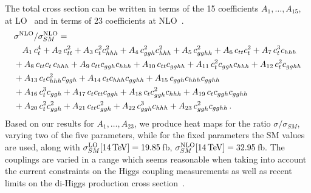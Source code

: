 
The total cross section can be written in terms of the 15 coefficients 
$A_1, \ldots, A_{15}$, at LO~\cite{Carvalho:2015ttv,Azatov:2015oxa} and in terms of 23 coefficients at NLO~\cite{Buchalla:2018yce}.
%
\begin{align}
\label{eq:Acoeffs_all}
&\sigma^{\rm{NLO}}/\sigma^{\rm{NLO}}_{SM}  =\nonumber\\
& \quad  A_1\, c_t^4 + A_2 \, c_{tt}^2  + A_3\,  c_t^2 c_{hhh}^2  + 
A_4 \, c_{ggh}^2 c_{hhh}^2  + A_5\,  c_{gghh}^2  + 
A_6\, c_{tt} c_t^2 + A_7\,  c_t^3 c_{hhh} \nonumber\\
& + A_8\,  c_{tt} c_t\, c_{hhh}  + A_9\, c_{tt} c_{ggh} c_{hhh} + A_{10}\, c_{tt} c_{gghh} + 
A_{11}\,  c_t^2 c_{ggh} c_{hhh} + A_{12}\, c_t^2 c_{gghh} \nonumber\\
& + A_{13}\, c_t c_{hhh}^2 c_{ggh}  + A_{14}\, c_t c_{hhh} c_{gghh} +
A_{15}\, c_{ggh} c_{hhh} c_{gghh} \nonumber\\ 
& + A_{16}\, c^3_t c_{ggh} + A_{17}\,  c_t c_{tt} c_{ggh} 
+ A_{18}\, c_t c_{ggh}^2 c_{hhh} + A_{19}\, c_t c_{ggh} c_{gghh} 
\nonumber\\
&+ A_{20}\,  c_t^2 c_{ggh}^2 + A_{21}\, c_{tt} c_{ggh}^2 
+ A_{22}\, c_{ggh}^3 c_{hhh} + A_{23}\, c_{ggh}^2 c_{gghh}\,.
\end{align}
Based on our results for $A_1,\ldots, A_{23}$, we produce heat maps for the ratio $\sigma/\sigma_{SM}$, 
varying two of the five parameters, while for the fixed parameters the SM values are used, along with
$\sigma_{SM}^{\rm{LO}}[14\,\mathrm{TeV}]=19.85$\,fb,
$\sigma_{SM}^{\rm{NLO}}[14\,\mathrm{TeV}]=32.95$\,fb.
The couplings are varied in a range which seems reasonable when taking into account the current constraints on the 
Higgs coupling measurements
as well as recent limits on the di-Higgs production cross
section~\cite{CMS-PAS-HIG-17-030,ATLAS-CONF-2018-043}.

